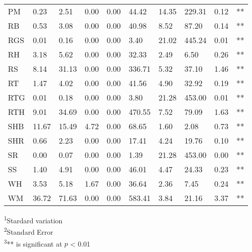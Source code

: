 \begin{landscape}
\begin{table}[]
\begin{tabular}{lllllllllc}
PM   & 0.23   & 2.51   & 0.00   & 0.00 & 44.42   & 14.35    & 229.31   & 0.12  & **               \\
RB   & 0.53   & 3.08   & 0.00   & 0.00 & 40.98   & 8.52     & 87.20    & 0.14  & **               \\
RGS  & 0.01   & 0.16   & 0.00   & 0.00 & 3.40    & 21.02    & 445.24   & 0.01  & **               \\
RH   & 3.18   & 5.62   & 0.00   & 0.00 & 32.33   & 2.49     & 6.50     & 0.26  & **               \\
RS   & 8.14   & 31.13  & 0.00   & 0.00 & 336.71  & 5.32     & 37.10    & 1.46  & **               \\
RT   & 1.47   & 4.02   & 0.00   & 0.00 & 41.56   & 4.90     & 32.92    & 0.19  & **               \\
RTG  & 0.01   & 0.18   & 0.00   & 0.00 & 3.80    & 21.28    & 453.00   & 0.01  & **               \\
RTH  & 9.01   & 34.69  & 0.00   & 0.00 & 470.55  & 7.52     & 79.09    & 1.63  & **               \\
SHB  & 11.67  & 15.49  & 4.72   & 0.00 & 68.65   & 1.60     & 2.08     & 0.73  & **               \\
SHR  & 0.66   & 2.23   & 0.00   & 0.00 & 17.41   & 4.24     & 19.76    & 0.10  & **               \\
SR   & 0.00   & 0.07   & 0.00   & 0.00 & 1.39    & 21.28    & 453.00   & 0.00  & **               \\
SS   & 1.40   & 4.91   & 0.00   & 0.00 & 46.01   & 4.47     & 24.33    & 0.23  & **               \\
WH   & 3.53   & 5.18   & 1.67   & 0.00 & 36.64   & 2.36     & 7.45     & 0.24  & **               \\
WM   & 36.72  & 71.63  & 0.00   & 0.00 & 583.41  & 3.84     & 21.16    & 3.37  & **               \\ 
\hline
\end{tabular}
\begin{tablenotes}
     \textsuperscript{1}Stardard variation \\
     \textsuperscript{2}Standard Error \\
     \textsuperscript{3}** is significant at $p$ < 0.01
    \end{tablenotes}
\end{table}
\end{landscape}